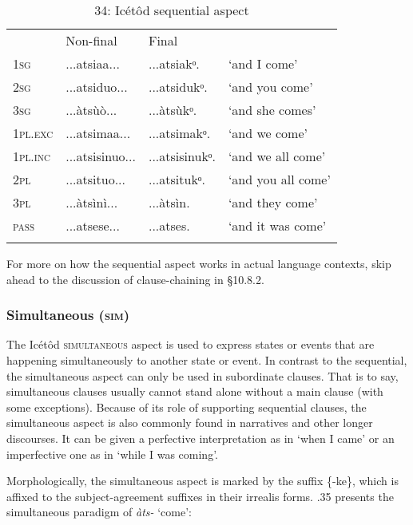 \begin{table}
\caption{34: Icétôd sequential aspect}
\label{tab:8}


\begin{tabularx}{\textwidth}{XXXX} & Non-final & Final & \\
\lsptoprule
\textsc{1sg} & ...atsiaa... & ...atsiakᵒ. & ‘and I come’\\
\textsc{2sg} & ...atsiduo... & ...atsidukᵒ. & ‘and you come’\\
\textsc{3sg} & ...àtsùò... & ...àtsùkᵒ. & ‘and she comes’\\
\textsc{1pl.exc} & ...atsimaa... & ...atsimakᵒ. & ‘and we come’\\
\textsc{1pl.inc} & ...atsisinuo... & ...atsisinukᵒ. & ‘and we all come’\\
\textsc{2pl} & ...atsituo... & ...atsitukᵒ. & ‘and you all come’\\
\textsc{3pl} & ...àtsìnì... & ...àtsìn. & ‘and they come’\\
\textsc{pass} & ...atsese... & ...atses. & ‘and it was come’\\
\lspbottomrule
\end{tabularx}
\end{table}
For more on how the sequential aspect works in actual language contexts, skip ahead to the discussion of clause-chaining in §10.8.2.


\subsubsection{Simultaneous (\textsc{sim})}

The Icétôd \textsc{simultaneous} aspect is used to express states or events that are happening simultaneously to another state or event. In contrast to the sequential, the simultaneous aspect can only be used in subordinate clauses. That is to say, simultaneous clauses usually cannot stand alone without a main clause (with some exceptions). Because of its role of supporting sequential clauses, the simultaneous aspect is also commonly found in narratives and other longer discourses. It can be given a perfective interpretation as in ‘when I came’ or an imperfective one as in ‘while I was coming’.

Morphologically, the simultaneous aspect is marked by the suffix \{-ke\}, which is affixed to the subject-agreement suffixes in their irrealis forms. .35 presents the simultaneous paradigm of \textit{àts-} ‘come’:


